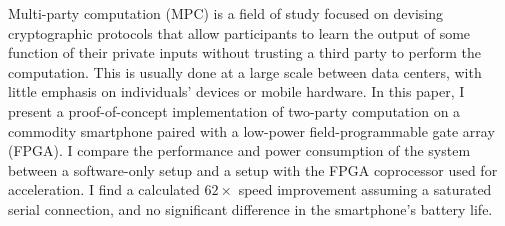 Multi-party computation (MPC) is a field of study focused on devising cryptographic protocols that allow participants to learn the output of some function of their private inputs without trusting a third party to perform the computation. This is usually done at a large scale between data centers, with little emphasis on individuals' devices or mobile hardware. In this paper, I present a proof-of-concept implementation of two-party computation on a commodity smartphone paired with a low-power field-programmable gate array (FPGA). I compare the performance and power consumption of the system between a software-only setup and a setup with the FPGA coprocessor used for acceleration. I find a calculated $62\times$ speed improvement assuming a saturated serial connection, and no significant difference in the smartphone's battery life.